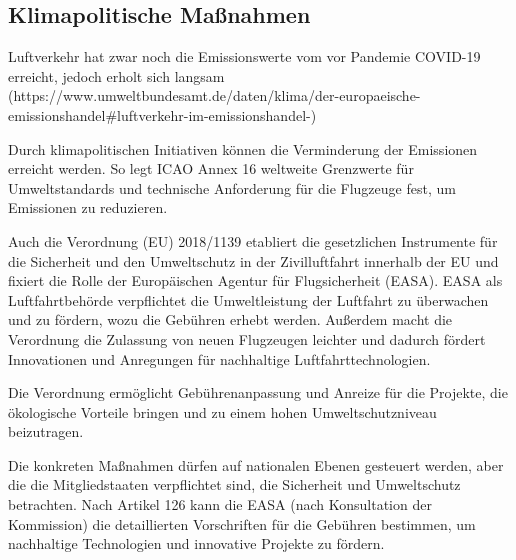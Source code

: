 \subsection{Klimapolitische Maßnahmen}
\label{s:Klimapolitische Maßnahmen}

Luftverkehr hat zwar noch die Emissionswerte vom vor Pandemie COVID-19 erreicht, jedoch erholt sich langsam
 (https://www.umweltbundesamt.de/daten/klima/der-europaeische-emissionshandel#luftverkehr-im-emissionshandel-)

Durch klimapolitischen Initiativen können die Verminderung der Emissionen erreicht werden. 
So legt ICAO Annex 16 weltweite Grenzwerte für Umweltstandards und technische Anforderung für die Flugzeuge fest, um Emissionen zu reduzieren.

Auch die Verordnung (EU) 2018/1139 etabliert die gesetzlichen Instrumente für die Sicherheit und den Umweltschutz in der Zivilluftfahrt innerhalb der EU 
und fixiert die Rolle der Europäischen Agentur für Flugsicherheit (EASA). EASA als Luftfahrtbehörde verpflichtet die 
Umweltleistung der Luftfahrt zu überwachen und zu fördern, wozu die Gebühren erhebt werden. Außerdem macht die Verordnung die Zulassung von
neuen Flugzeugen leichter und dadurch fördert Innovationen und Anregungen für nachhaltige Luftfahrttechnologien.

Die Verordnung ermöglicht Gebührenanpassung und Anreize für die Projekte, die ökologische Vorteile bringen und 
zu einem hohen Umweltschutzniveau beizutragen.

Die konkreten Maßnahmen dürfen auf nationalen Ebenen gesteuert werden, aber die die Mitgliedstaaten verpflichtet sind, 
die Sicherheit und Umweltschutz betrachten. Nach Artikel 126 kann die EASA (nach Konsultation der Kommission) die detaillierten 
Vorschriften für die Gebühren bestimmen, um nachhaltige Technologien und innovative Projekte zu fördern.
%


